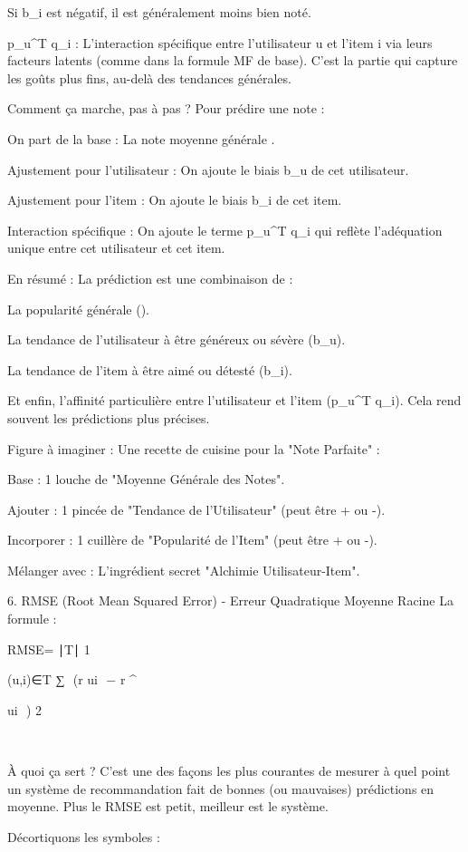 Si b_i est négatif, il est généralement moins bien noté.

p_u^T q_i : L'interaction spécifique entre l'utilisateur u et l'item i via leurs facteurs latents (comme dans la formule MF de base). C'est la partie qui capture les goûts plus fins, au-delà des tendances générales.

Comment ça marche, pas à pas ?
Pour prédire une note :

On part de la base : La note moyenne générale \mu.

Ajustement pour l'utilisateur : On ajoute le biais b_u de cet utilisateur.

Ajustement pour l'item : On ajoute le biais b_i de cet item.

Interaction spécifique : On ajoute le terme p_u^T q_i qui reflète l'adéquation unique entre cet utilisateur et cet item.

En résumé : La prédiction est une combinaison de :

La popularité générale (\mu).

La tendance de l'utilisateur à être généreux ou sévère (b_u).

La tendance de l'item à être aimé ou détesté (b_i).

Et enfin, l'affinité particulière entre l'utilisateur et l'item (p_u^T q_i).
Cela rend souvent les prédictions plus précises.

Figure à imaginer :
Une recette de cuisine pour la "Note Parfaite" :

Base : 1 louche de "Moyenne Générale des Notes".

Ajouter : 1 pincée de "Tendance de l'Utilisateur" (peut être + ou -).

Incorporer : 1 cuillère de "Popularité de l'Item" (peut être + ou -).

Mélanger avec : L'ingrédient secret "Alchimie Utilisateur-Item".

6. RMSE (Root Mean Squared Error) - Erreur Quadratique Moyenne Racine
La formule :


RMSE= 
∣T∣
1
​
  
(u,i)∈T
∑
​
 (r 
ui
​
 − 
r
^
  
ui
​
 ) 
2
 
​
 
À quoi ça sert ?
C'est une des façons les plus courantes de mesurer à quel point un système de recommandation fait de bonnes (ou mauvaises) prédictions en moyenne. Plus le RMSE est petit, meilleur est le système.

Décortiquons les symboles :


